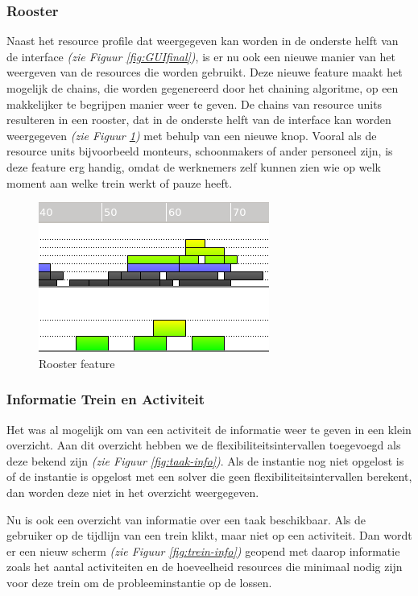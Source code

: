 \subsubsection*{Rooster}
Naast het resource profile dat weergegeven kan worden in de onderste helft van de interface \emph{(zie Figuur \ref{fig:GUIfinal})}, is er nu ook een nieuwe manier van het weergeven van de resources die worden gebruikt. Deze nieuwe feature maakt het mogelijk de chains, die worden gegenereerd door het chaining algoritme, op een makkelijker te begrijpen manier weer te geven. De chains van resource units resulteren in een rooster, dat in de onderste helft van de interface kan worden weergegeven \emph{(zie Figuur \ref{fig:rooster})} met behulp van een nieuwe knop. Vooral als de resource units bijvoorbeeld monteurs, schoonmakers of ander personeel zijn, is deze feature erg handig, omdat de werknemers zelf kunnen zien wie op welk moment aan welke trein werkt of pauze heeft. 

\begin{figure}[H]
\center
\includegraphics[width=.5\textwidth]{../images/rooster.png}
\caption{Rooster feature}
\label{fig:rooster}
\end{figure}

\subsubsection*{Informatie Trein en Activiteit}
Het was al mogelijk om van een activiteit de informatie weer te geven in een klein overzicht. Aan dit overzicht hebben we de flexibiliteitsintervallen toegevoegd als deze bekend zijn \emph{(zie Figuur \ref{fig:taak-info})}. Als de instantie nog niet opgelost is of de instantie is opgelost met een solver die geen flexibiliteitsintervallen berekent, dan worden deze niet in het overzicht weergegeven.  

Nu is ook een overzicht van informatie over een taak beschikbaar. Als de gebruiker op de tijdlijn van een trein klikt, maar niet op een activiteit. Dan wordt er een nieuw scherm \emph{(zie Figuur \ref{fig:trein-info})} geopend met daarop informatie zoals het aantal activiteiten en de hoeveelheid resources die minimaal nodig zijn voor deze trein om de probleeminstantie op de lossen. 

